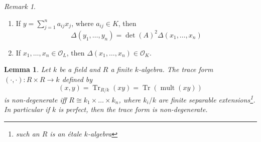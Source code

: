 \documentclass[11pt]{article}
\theoremstyle{definition}
\theoremstyle{plain}
\newtheorem{lemma}[definition]{Lemma}
\theoremstyle{remark}
\newtheorem*{remark}{Remark}
\DeclareMathOperator{\Tr}{Tr}
\DeclareMathOperator{\mult}{mult}
\newcommand{\cO}{\mathcal{O}}
\begin{document}
\begin{remark}\phantom{}
    \begin{enumerate}
        \item If $y = \sum_{j=1}^n a_{ij}x_j$, where $a_{ij} \in K$, then
            \begin{equation*}
                \Delta(y_1, \ldots, y_n) = \det(A)^2 \Delta(x_1, \ldots, x_n)
            \end{equation*}
        \item If $x_1, \ldots, x_n \in \cO_L$, then $\Delta(x_1, \ldots, x_n) \in \cO_K$.
    \end{enumerate}
\end{remark}

\begin{lemma}\label{lem:12_1}
    Let $k$ be a field and $R$ a finite $k$-algebra. The trace form $(\cdot, \cdot) : R \times R \to k$ defined by
    \begin{equation*}
        (x, y) = \Tr_{R/k}(xy) = \Tr(\mult(xy))
    \end{equation*}
    is non-degenerate iff $R \cong k_1 \times \ldots \times k_n$, where $k_i / k$ are finite separable extensions\footnote{such an $R$ is an \emph{\'etale $k$-algebra}}. In particular if $k$ is perfect, then the trace form is non-degenerate.
\end{lemma}
\end{document}
